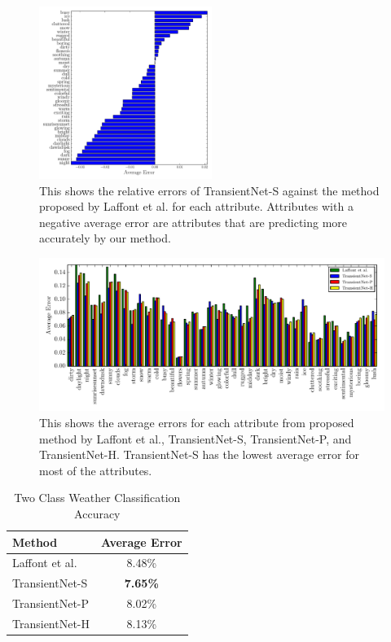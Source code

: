 \documentclass{article}
\begin{document}
\begin{figure}[t]
	\centering
		\includegraphics[width=0.5\textwidth]{figs/rel_err_cmr.pdf}
		\caption{This shows the relative errors of TransientNet-S against the method 
						 proposed by Laffont et al. for each attribute.  Attributes with a 
						 negative average error are attributes that are predicting more 
						 accurately by our method.}
		\label{fig:relerr}
\end{figure}

\begin{figure}[t]
	\centering
		\includegraphics[width=1.0\textwidth]{figs/avg_err_compare_cmr.pdf}
		\caption{This shows the average errors for each attribute from proposed method
						 by Laffont et al., TransientNet-S, TransientNet-P, and TransientNet-H.  
             TransientNet-S has the lowest average error for most of the attributes.}
		\label{fig:compare}
\end{figure}

\begin{table}[t]
	\centering
	\begin{tabular}{ | l | c | }
		\hline
			Method & Average Error \\ \hline
			Laffont et al.~\cite{Laffont14}& 8.48\% \\ \hline
			TransientNet-S & \textbf{7.65\%} \\ \hline
			TransientNet-P & 8.02\% \\ \hline
			TransientNet-H & 8.13\% \\ 
		\hline
	\end{tabular}
	\caption{Two Class Weather Classification Accuracy}
	\label{tbl:transient}
\end{table}
\end{document}
